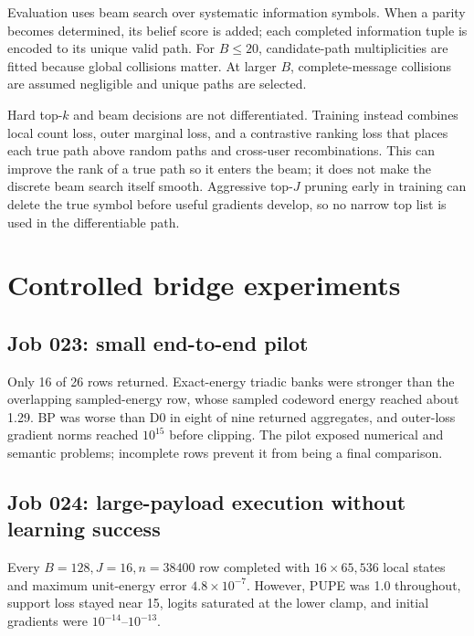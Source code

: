 \documentclass[11pt]{article}
\begin{document}
Evaluation uses beam search over systematic information symbols. When a parity becomes determined, its belief score is
added; each completed information tuple is encoded to its unique valid path. For $B\le20$, candidate-path
multiplicities are fitted because global collisions matter. At larger $B$, complete-message collisions are assumed
negligible and unique paths are selected.

Hard top-$k$ and beam decisions are not differentiated. Training instead combines local count loss, outer marginal
loss, and a contrastive ranking loss that places each true path above random paths and cross-user recombinations. This
can improve the rank of a true path so it enters the beam; it does not make the discrete beam search itself smooth.
Aggressive top-$J$ pruning early in training can delete the true symbol before useful gradients develop, so no narrow
top list is used in the differentiable path.

\section{Controlled bridge experiments}

\subsection{Job 023: small end-to-end pilot}

Only 16 of 26 rows returned. Exact-energy triadic banks were stronger than the overlapping sampled-energy row, whose
sampled codeword energy reached about 1.29. BP was worse than D0 in eight of nine returned aggregates, and outer-loss
gradient norms reached $10^{15}$ before clipping. The pilot exposed numerical and semantic problems; incomplete rows
prevent it from being a final comparison.

\subsection{Job 024: large-payload execution without learning success}

Every $B=128,J=16,n=38400$ row completed with $16\times65{,}536$ local states and maximum unit-energy error
$4.8\times10^{-7}$. However, PUPE was 1.0 throughout, support loss stayed near 15, logits saturated at the lower clamp,
and initial gradients were $10^{-14}$--$10^{-13}$.

\end{document}
